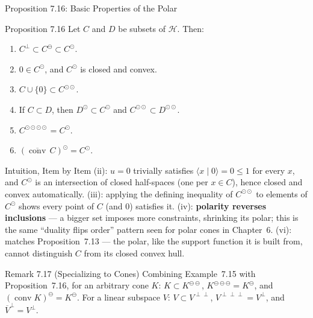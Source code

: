\documentclass[aspectratio=169,10pt]{beamer}
\DeclareMathOperator{\conv}{conv}
\newcommand{\Hil}{\mathcal{H}}
\newcommand{\ip}[2]{\langle #1 \mid #2 \rangle}
\newcommand{\closure}[1]{\overline{#1}}
\begin{document}
\begin{frame}[allowframebreaks]{Proposition 7.16: Basic Properties of the Polar}

  \begin{block}{Proposition 7.16}
    Let $C$ and $D$ be subsets of $\Hil$. Then:
    \begin{enumerate}
      \item[(i)] $C^\perp \subset C^\ominus \subset C^\odot$.
      \item[(ii)] $0 \in C^\odot$, and $C^\odot$ is closed and convex.
      \item[(iii)] $C \cup \{0\} \subset C^{\odot\odot}$.
      \item[(iv)] If $C \subset D$, then $D^\odot \subset C^\odot$ and
        $C^{\odot\odot} \subset D^{\odot\odot}$.
      \item[(v)] $C^{\odot\odot\odot\odot} = C^\odot$.
      \item[(vi)] $(\closure{\conv}\,C)^\odot = C^\odot$.
    \end{enumerate}
  \end{block}

  \begin{block}{Intuition, Item by Item}
    (ii): $u=0$ trivially satisfies $\ip{x}{0}=0\le 1$ for every $x$, and
    $C^\odot$ is an intersection of closed half-spaces (one per $x \in C$),
    hence closed and convex automatically. (iii): applying the defining
    inequality of $C^{\odot\odot}$ to elements of $C^\odot$ shows every point
    of $C$ (and $0$) satisfies it. (iv): \textbf{polarity reverses
    inclusions} --- a bigger set imposes more constraints, shrinking its
    polar; this is the same ``duality flips order'' pattern seen for polar
    cones in Chapter~6. (vi): matches Proposition~7.13 --- the polar, like
    the support function it is built from, cannot distinguish $C$ from its
    closed convex hull.
  \end{block}

  \framebreak

  \begin{block}{Remark 7.17 (Specializing to Cones)}
    Combining Example~7.15 with Proposition~7.16, for an arbitrary cone $K$:
    $K \subset K^{\ominus\ominus}$, $K^{\ominus\ominus\ominus} =
    K^\ominus$, and $(\conv K)^\ominus = K^\ominus$. For a linear subspace
    $V$: $V \subset V^{\perp\perp}$, $V^{\perp\perp\perp}=V^\perp$, and
    $\closure{V}^\perp = V^\perp$.
  \end{block}

\end{frame}
\end{document}
